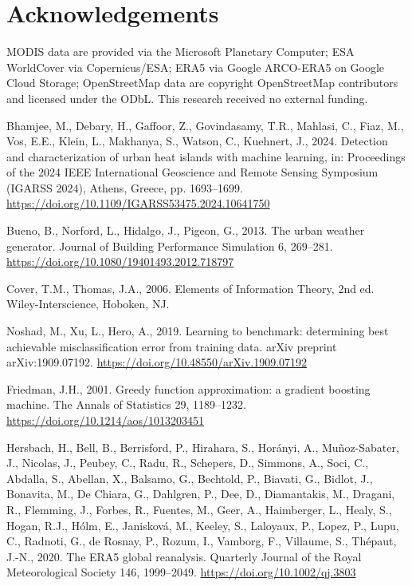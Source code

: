 \documentclass[preprint,12pt,authoryear]{elsarticle}
\begin{document}
\section*{Acknowledgements}

MODIS data are provided via the Microsoft Planetary Computer; ESA
WorldCover via Copernicus/ESA; ERA5 via Google ARCO-ERA5 on Google Cloud
Storage; OpenStreetMap data are copyright OpenStreetMap contributors and
licensed under the ODbL. This research received no external funding.


\begin{thebibliography}{}

Bhamjee, M., Debary, H., Gaffoor, Z., Govindasamy, T.R., Mahlasi, C.,
Fiaz, M., Vos, E.E., Klein, L., Makhanya, S., Watson, C., Kuehnert, J.,
2024. Detection and characterization of urban heat islands with machine
learning, in: Proceedings of the 2024 IEEE International Geoscience and
Remote Sensing Symposium (IGARSS 2024), Athens, Greece, pp. 1693--1699.
\url{https://doi.org/10.1109/IGARSS53475.2024.10641750}

Bueno, B., Norford, L., Hidalgo, J., Pigeon, G., 2013. The urban weather
generator. Journal of Building Performance Simulation 6, 269--281.
\url{https://doi.org/10.1080/19401493.2012.718797}

Cover, T.M., Thomas, J.A., 2006. Elements of Information Theory, 2nd ed.
Wiley-Interscience, Hoboken, NJ.

Noshad, M., Xu, L., Hero, A., 2019. Learning to benchmark: determining
best achievable misclassification error from training data. arXiv preprint
arXiv:1909.07192. \url{https://doi.org/10.48550/arXiv.1909.07192}

Friedman, J.H., 2001. Greedy function approximation: a gradient boosting
machine. The Annals of Statistics 29, 1189--1232.
\url{https://doi.org/10.1214/aos/1013203451}

Hersbach, H., Bell, B., Berrisford, P., Hirahara, S., Hor\'anyi, A.,
Mu\~noz-Sabater, J., Nicolas, J., Peubey, C., Radu, R., Schepers, D.,
Simmons, A., Soci, C., Abdalla, S., Abellan, X., Balsamo, G.,
Bechtold, P., Biavati, G., Bidlot, J., Bonavita, M., De Chiara, G.,
Dahlgren, P., Dee, D., Diamantakis, M., Dragani, R., Flemming, J.,
Forbes, R., Fuentes, M., Geer, A., Haimberger, L., Healy, S.,
Hogan, R.J., H\'olm, E., Janiskov\'a, M., Keeley, S., Laloyaux, P.,
Lopez, P., Lupu, C., Radnoti, G., de Rosnay, P., Rozum, I., Vamborg, F.,
Villaume, S., Th\'epaut, J.-N., 2020. The ERA5 global reanalysis.
Quarterly Journal of the Royal Meteorological Society 146, 1999--2049.
\url{https://doi.org/10.1002/qj.3803}


\end{thebibliography}
\end{document}
